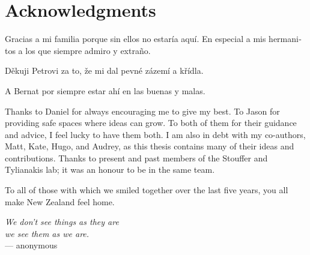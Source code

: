 {}
\chapter*{Acknowledgments}

\begin{otherlanguage}{spanish}
Gracias a mi familia porque sin ellos no estaría aquí.
En especial a mis hermanitos a los que siempre admiro y extraño.
\end{otherlanguage}
\begin{otherlanguage}{spanish}
Děkuji Petrovi za to, že mi dal pevné zázemí a křídla.
\end{otherlanguage}
\begin{otherlanguage}{spanish}
A Bernat por siempre estar ahí en las buenas y malas.
\end{otherlanguage}

Thanks to Daniel for always encouraging me to give my best.
To Jason for providing safe spaces where ideas can grow.
To both of them for their guidance and advice, I feel lucky to have them both.
I am also in debt with my co-authors, Matt, Kate, Hugo, and Audrey, as this thesis contains many of their ideas and contributions.
Thanks to present and past members of the Stouffer and Tylianakis lab; it was an honour to be in the same team.

To all of those with which we smiled together over the last five years, you all make New Zealand feel home.

\begin{flushright}{\slshape
    We don't see things as they are \\
    we see them as we are.} \\ \medskip
    --- anonymous
\end{flushright}

\bigskip

